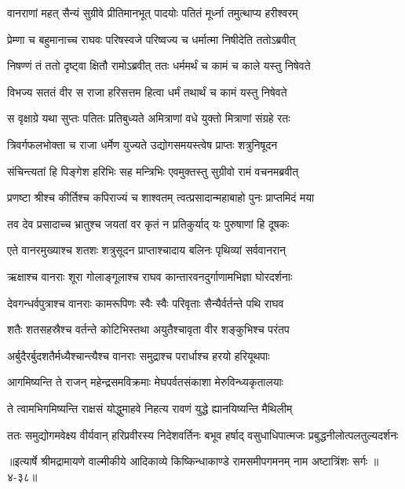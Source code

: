 \twolineshloka
{वानराणां महत् सैन्यं सुग्रीवे प्रीतिमानभूत्}
{पादयोः पतितं मूर्ध्ना तमुत्थाप्य हरीश्वरम्} %

\twolineshloka
{प्रेम्णा च बहुमानाच्च राघवः परिषस्वजे}
{परिष्वज्य च धर्मात्मा निषीदेति ततोऽब्रवीत्} %

\twolineshloka
{निषण्णं तं ततो दृष्ट्वा क्षितौ रामोऽब्रवीत् ततः}
{धर्ममर्थं च कामं च काले यस्तु निषेवते} %

\twolineshloka
{विभज्य सततं वीर स राजा हरिसत्तम}
{हित्वा धर्मं तथार्थं च कामं यस्तु निषेवते} %

\twolineshloka
{स वृक्षाग्रे यथा सुप्तः पतितः प्रतिबुध्यते}
{अमित्राणां वधे युक्तो मित्राणां संग्रहे रतः} %

\twolineshloka
{त्रिवर्गफलभोक्ता च राजा धर्मेण युज्यते}
{उद्योगसमयस्त्वेष प्राप्तः शत्रुनिषूदन} %

\twolineshloka
{संचिन्त्यतां हि पिङ्गेश हरिभिः सह मन्त्रिभिः}
{एवमुक्तस्तु सुग्रीवो रामं वचनमब्रवीत्} %

\twolineshloka
{प्रणष्टा श्रीश्च कीर्तिश्च कपिराज्यं च शाश्वतम्}
{त्वत्प्रसादान्महाबाहो पुनः प्राप्तमिदं मया} %

\twolineshloka
{तव देव प्रसादाच्च भ्रातुश्च जयतां वर}
{कृतं न प्रतिकुर्याद् यः पुरुषाणां हि दूषकः} %

\twolineshloka
{एते वानरमुख्याश्च शतशः शत्रुसूदन}
{प्राप्ताश्चादाय बलिनः पृथिव्यां सर्ववानरान्} %

\twolineshloka
{ऋक्षाश्च वानराः शूरा गोलाङ्गूलाश्च राघव}
{कान्तारवनदुर्गाणामभिज्ञा घोरदर्शनाः} %

\twolineshloka
{देवगन्धर्वपुत्राश्च वानराः कामरूपिणः}
{स्वैः स्वैः परिवृताः सैन्यैर्वर्तन्ते पथि राघव} %

\twolineshloka
{शतैः शतसहस्रैश्च वर्तन्ते कोटिभिस्तथा}
{अयुतैश्चावृता वीर शङ्कुभिश्च परंतप} %

\twolineshloka
{अर्बुदैरर्बुदशतैर्मध्यैश्चान्त्यैश्च वानराः}
{समुद्राश्च परार्धाश्च हरयो हरियूथपाः} %

\twolineshloka
{आगमिष्यन्ति ते राजन् महेन्द्रसमविक्रमाः}
{मेघपर्वतसंकाशा मेरुविन्ध्यकृतालयाः} %

\twolineshloka
{ते त्वामभिगमिष्यन्ति राक्षसं योद्धुमाहवे}
{निहत्य रावणं युद्धे ह्यानयिष्यन्ति मैथिलीम्} %

\twolineshloka
{ततः समुद्योगमवेक्ष्य वीर्यवान् हरिप्रवीरस्य निदेशवर्तिनः}
{बभूव हर्षाद् वसुधाधिपात्मजः प्रबुद्धनीलोत्पलतुल्यदर्शनः} %


॥इत्यार्षे श्रीमद्रामायणे वाल्मीकीये आदिकाव्ये किष्किन्धाकाण्डे रामसमीपगमनम् नाम अष्टात्रिंशः सर्गः ॥४-३८॥

